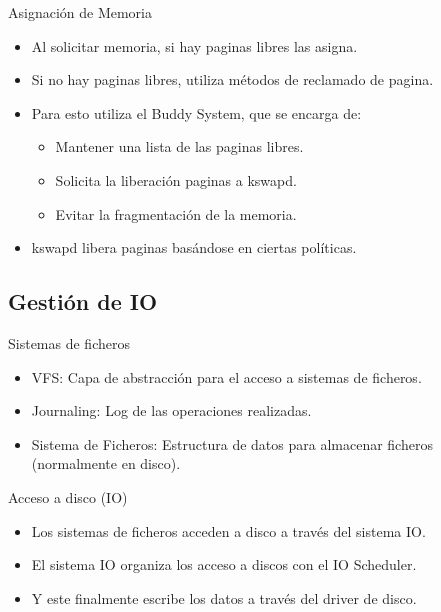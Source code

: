 \begin{frame}{Asignación de Memoria}
	\begin{itemize}
		\item Al solicitar memoria, si hay paginas libres las asigna.
		\item Si no hay paginas libres, utiliza métodos de reclamado de pagina.
		\item Para esto utiliza el Buddy System, que se encarga de:
		\begin{itemize}
			\item Mantener una lista de las paginas libres.
			\item Solicita la liberación paginas a kswapd.
			\item Evitar la fragmentación de la memoria.
		\end{itemize}
		\item kswapd libera paginas basándose en ciertas políticas.
	\end{itemize}
\end{frame}

\subsection{Gestión de IO}
\begin{frame}{Sistemas de ficheros}
	\begin{itemize}
		\item VFS: Capa de abstracción para el acceso a sistemas de ficheros.
		\item Journaling: Log de las operaciones realizadas.
		\item Sistema de Ficheros: Estructura de datos para almacenar ficheros (normalmente en disco).
	\end{itemize}
\end{frame}

\begin{frame}{Acceso a disco (IO)}
	\begin{itemize}
		\item Los sistemas de ficheros acceden a disco a través del sistema IO.
		\item El sistema IO organiza los acceso a discos con el IO Scheduler.
		\item Y este finalmente escribe los datos a través del driver de disco.
	\end{itemize}
\end{frame}

